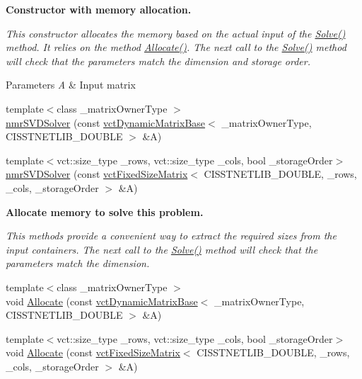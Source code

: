 \begin{Indent}{\bf Constructor with memory allocation.}\par
{\em This constructor allocates the memory based on the actual input of the \hyperlink{classnmr_s_v_d_solver_a8f0a70263a6d3970948ca42f8fb6fb65}{Solve()} method. It relies on the method \hyperlink{classnmr_s_v_d_solver_af32d34f0fc16618b2b0658b198d2dd85}{Allocate()}. The next call to the \hyperlink{classnmr_s_v_d_solver_a8f0a70263a6d3970948ca42f8fb6fb65}{Solve()} method will check that the parameters match the dimension and storage order.


\begin{DoxyParams}{Parameters}
{\em A} & Input matrix \\
\hline
\end{DoxyParams}
}\begin{DoxyCompactItemize}
\item 
{\footnotesize template$<$class \-\_\-matrix\-Owner\-Type $>$ }\\\hyperlink{classnmr_s_v_d_solver_a139d37cb485ba179bd704380297b0cef}{nmr\-S\-V\-D\-Solver} (const \hyperlink{classvct_dynamic_matrix_base}{vct\-Dynamic\-Matrix\-Base}$<$ \-\_\-matrix\-Owner\-Type, C\-I\-S\-S\-T\-N\-E\-T\-L\-I\-B\-\_\-\-D\-O\-U\-B\-L\-E $>$ \&A)
\item 
{\footnotesize template$<$vct\-::size\-\_\-type \-\_\-rows, vct\-::size\-\_\-type \-\_\-cols, bool \-\_\-storage\-Order$>$ }\\\hyperlink{classnmr_s_v_d_solver_a9c895fce1bce377745613bfaeaa84853}{nmr\-S\-V\-D\-Solver} (const \hyperlink{classvct_fixed_size_matrix}{vct\-Fixed\-Size\-Matrix}$<$ C\-I\-S\-S\-T\-N\-E\-T\-L\-I\-B\-\_\-\-D\-O\-U\-B\-L\-E, \-\_\-rows, \-\_\-cols, \-\_\-storage\-Order $>$ \&A)
\end{DoxyCompactItemize}
\end{Indent}
\begin{Indent}{\bf Allocate memory to solve this problem.}\par
{\em This methods provide a convenient way to extract the required sizes from the input containers. The next call to the \hyperlink{classnmr_s_v_d_solver_a8f0a70263a6d3970948ca42f8fb6fb65}{Solve()} method will check that the parameters match the dimension. }\begin{DoxyCompactItemize}
\item 
{\footnotesize template$<$class \-\_\-matrix\-Owner\-Type $>$ }\\void \hyperlink{classnmr_s_v_d_solver_a251cfe773b95c7d56ead059cdb9d571f}{Allocate} (const \hyperlink{classvct_dynamic_matrix_base}{vct\-Dynamic\-Matrix\-Base}$<$ \-\_\-matrix\-Owner\-Type, C\-I\-S\-S\-T\-N\-E\-T\-L\-I\-B\-\_\-\-D\-O\-U\-B\-L\-E $>$ \&A)
\item 
{\footnotesize template$<$vct\-::size\-\_\-type \-\_\-rows, vct\-::size\-\_\-type \-\_\-cols, bool \-\_\-storage\-Order$>$ }\\void \hyperlink{classnmr_s_v_d_solver_a895dc04aa64bf8fbe41936453d2a3af9}{Allocate} (const \hyperlink{classvct_fixed_size_matrix}{vct\-Fixed\-Size\-Matrix}$<$ C\-I\-S\-S\-T\-N\-E\-T\-L\-I\-B\-\_\-\-D\-O\-U\-B\-L\-E, \-\_\-rows, \-\_\-cols, \-\_\-storage\-Order $>$ \&A)
\end{DoxyCompactItemize}
\end{Indent}
